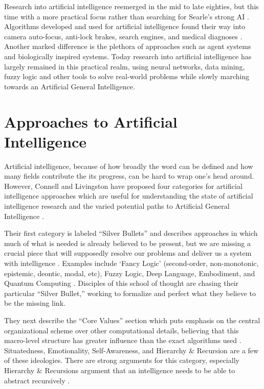 \documentclass[oneside,12pt,openany]{book}
\begin{document}
	Research into artificial intelligence reemerged in the mid to late eighties, but this time with a more practical focus rather than searching for Searle's strong AI \cite{Jones}. Algorithms developed and used for artificial intelligence found their way into camera auto-focus, anti-lock brakes, search engines, and medical diagnoses \cite{Jones}. Another marked difference is the plethora of approaches such as agent systems and biologically inspired systems. Today research into artificial intelligence has largely remained in this practical realm, using neural networks, data mining, fuzzy logic and other tools to solve real-world problems while slowly marching towards an Artificial General Intelligence.
	
	\section{Approaches to Artificial Intelligence}
	
	Artificial intelligence, because of how broadly the word can be defined and how many fields contribute the its progress, can be hard to wrap one's head around. However, Connell and Livingston have proposed four categories for artificial intelligence approaches which are useful for understanding the state of artificial intelligence research and the varied potential paths to Artificial General Intelligence \cite{Connell}.
	
	Their first category is labeled ``Silver Bullets'' and describes approaches in which much of what is needed is already believed to be present, but we are missing a crucial piece that will supposedly resolve our problems and deliver us a system with intelligence \cite{Connell}. Examples include `Fancy Logic' (second-order, non-monotonic, epistemic, deontic, modal, etc), Fuzzy Logic, Deep Language, Embodiment, and Quantum Computing \cite{Connell}. Disciples of this school of thought are chasing their particular ``Silver Bullet,'' working to formalize and perfect what they believe to be the missing link.
	
	They next describe the ``Core Values'' section which puts emphasis on the central organizational scheme over other computational details, believing that this macro-level structure has greater influence than the exact algorithms used \cite{Connell}. Situatedness, Emotionality, Self-Awareness, and Hierarchy \& Recursion are a few of these ideologies. There are strong arguments for this category, especially Hierarchy \& Recursions argument that an intelligence needs to be able to abstract recursively \cite{Connell}.
	
\end{document}
